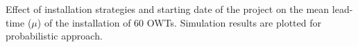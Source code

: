 \label{fig:strategies}
Effect of installation strategies and starting date of the project on the mean lead-time ($\mu$) of the installation of 60 OWTs. Simulation results are plotted for probabilistic approach.